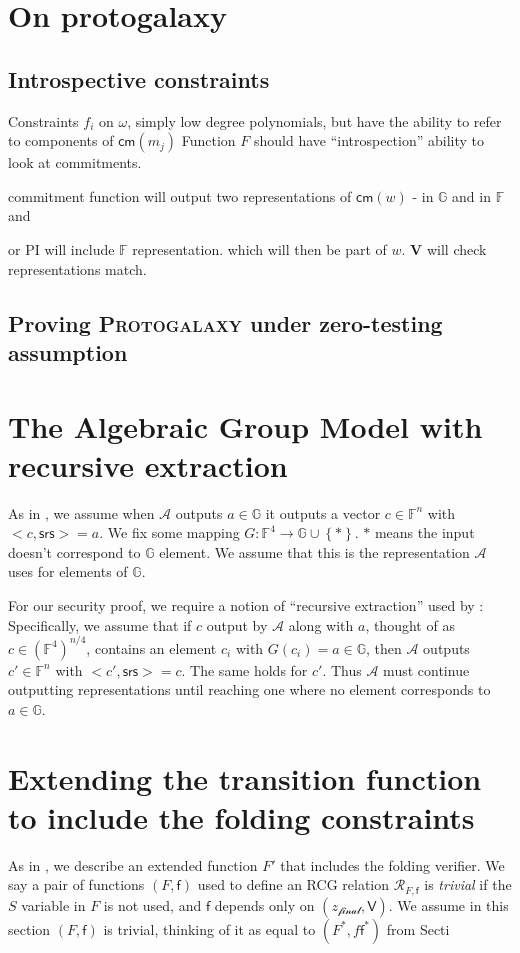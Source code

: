 \documentclass[11pt]{article} %
\newcommand{\protogal}{{\scshape Proto\bfseries{galaxy}}\xspace}
\newcommand{\V}{\ensuremath{\mathbf{V} }\xspace}
\newcommand{\G}{\ensuremath{{\mathbb G}}\xspace}
\newcommand{\F}{\ensuremath{\mathbb F}\xspace}
\newcommand{\adv}{\ensuremath{\mathcal A}\xspace}
\newcommand{\srs}{\ensuremath{\mathsf{srs}}\xspace}
\newcommand{\cm}{\ensuremath{\mathsf{cm}}\xspace}
\newcommand{\wit}{\ensuremath{\mathsf{\omega}}\xspace}
\newcommand{\rel}{\ensuremath{\mathcal{R}}\xspace}
\newcommand{\set}[1]{\ensuremath{\left\{#1\right\}}\xspace}
\newcommand{\A}{\ensuremath{\mathcal{A}}\xspace}
\newcommand{\zfin}{\ensuremath{z_{\mathscr{final}}}\xspace}
\newcommand{\recset}{\ensuremath{\mathsf{V}}\xspace}
\newcommand{\finpred}{\ensuremath{\mathsf{f}}\xspace}
\begin{document}
\section{On protogalaxy}
\subsection{Introspective constraints}
Constraints $f_i$ on \wit, simply low degree polynomials, but have the ability to refer to
components of $\cm(m_j)$
Function $F$ should have ``introspection'' ability to look at commitments.

commitment function will output two representations of $\cm(w)$ - in \G and in \F and 

or PI will include \F representation. which will then be part of $w$. \V will check representations match.
\subsection{Proving \protogal under zero-testing assumption}
\section{The Algebraic Group Model with recursive extraction}
As in \cite{agm}, we assume when \adv outputs $a\in \G$ it outputs a vector $c\in \F^n$ 
with $<c,\srs>=a$. We fix some mapping $G:\F^4\to \G\cup \set{*}$. $*$ means the input doesn't correspond to \G element. We assume that this is the representation \adv uses for elements of \G.

For our security proof, we require a notion of ``recursive extraction'' used by \cite{novarecursive}:
Specifically, we assume that if $c$ output by \A along with $a$, thought of as $c\in(\F^4)^{n/4}$, contains an element $c_i$ with $G(c_i)=a\in \G$, then \A outputs 
$c'\in \F^n$ with $<c',\srs>=c$. The same holds for $c'$. Thus \A must continue outputting representations
until reaching one where no element corresponds to $a\in \G$.


\section{Extending the transition function to include the folding constraints}\label{sec:FtoFprime}

As in \cite{nova,othernova}, we describe an extended function $F'$ that includes the folding verifier.
We say  a pair of functions $(F,\finpred)$ used to define an RCG relation $\rel_{F,\finpred}$ is \emph{trivial} if the $S$ variable in $F$ is not used, and \finpred depends only on $(\zfin,\recset)$.
We assume in this section $(F,\finpred)$ is trivial, thinking of it as equal to $(F^*,f\finpred^*)$ from Secti
\end{document}
